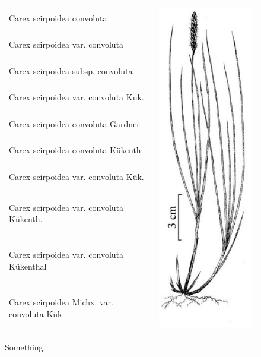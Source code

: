 \documentclass{bmcart}
\begin{document}
\begin{figure}[h!]
  \caption{Something}
  \centering
  \begin{tabular}{| l | c |}
  \hline
  Carex scirpoidea convoluta &
  \multirow{25}{*}{\includegraphics[scale=0.3]{images/carex.png}} \\
  Carex scirpoidea var. convoluta & \\
  Carex scirpoidea subsp. convoluta & \\
  Carex scirpoidea var. convoluta Kuk. & \\
  Carex scirpoidea convoluta Gardner & \\
  Carex scirpoidea convoluta Kükenth. & \\
  Carex scirpoidea var. convoluta Kük. & \\
  Carex scirpoidea var. convoluta Kükenth. & \\
  Carex scirpoidea var. convoluta Kükenthal & \\
  Carex scirpoidea Michx. var. convoluta Kük. & \\

\end{tabular}
\end{figure}
\end{document}
